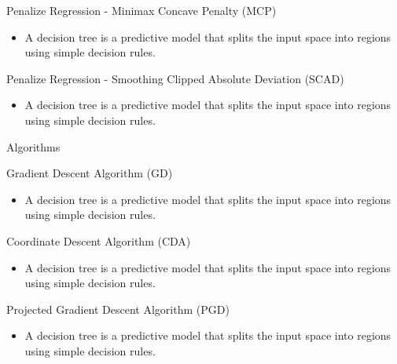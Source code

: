 \documentclass[
  8pt,
  ignorenonframetext,
]{beamer}
\providecommand{\tightlist}{%
  \setlength{\itemsep}{0pt}\setlength{\parskip}{0pt}}
\begin{document}
\begin{frame}{Penalize Regression - Minimax Concave Penalty (MCP)}
\label{penalize-regression---minimax-concave-penalty-mcp}
\begin{itemize}
\tightlist
\item
  A decision tree is a predictive model that splits the input space into
  regions using simple decision rules.
\end{itemize}
\end{frame}

\begin{frame}{Penalize Regression - Smoothing Clipped Absolute Deviation
(SCAD)}
\label{penalize-regression---smoothing-clipped-absolute-deviation-scad}
\begin{itemize}
\tightlist
\item
  A decision tree is a predictive model that splits the input space into
  regions using simple decision rules.
\end{itemize}

\begin{block}{Algorithms}
\label{algorithms}
\end{block}
\end{frame}

\begin{frame}{Gradient Descent Algorithm (GD)}
\label{gradient-descent-algorithm-gd}
\begin{itemize}
\tightlist
\item
  A decision tree is a predictive model that splits the input space into
  regions using simple decision rules.
\end{itemize}
\end{frame}

\begin{frame}{Coordinate Descent Algorithm (CDA)}
\label{coordinate-descent-algorithm-cda}
\begin{itemize}
\tightlist
\item
  A decision tree is a predictive model that splits the input space into
  regions using simple decision rules.
\end{itemize}
\end{frame}

\begin{frame}{Projected Gradient Descent Algorithm (PGD)}
\label{projected-gradient-descent-algorithm-pgd}
\begin{itemize}
\tightlist
\item
  A decision tree is a predictive model that splits the input space into
  regions using simple decision rules.
\end{itemize}
\end{frame}
\end{document}

